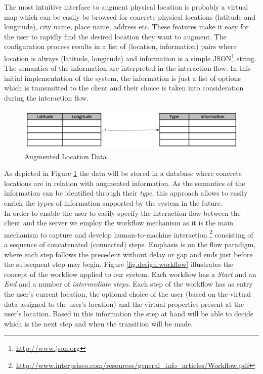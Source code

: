 \noindent The most intuitive interface to augment physical location is probably a virtual map which can be easily be browsed for concrete physical locations (latitude and longitude), city name, place name, address etc. These features make it easy for the user to rapidly find the desired location they want to augment. The configuration process results in a list of (location, information) pairs where location is always (latitude, longitude) and information is a simple JSON\footnote{\url{http://www.json.org}} string. The semantics of the information are interpreted in the interaction flow. In this initial implementation of the system, the information is just a list of options which is transmitted to the client and their choice is taken into consideration during the interaction flow.
\\

\begin{figure}[H]
	\centering
	\includegraphics[width=1.0\linewidth]{fig/virtual_properties}
	\caption{Augmented Location Data}
	\label{fig.design.virtual_properties}
\end{figure}
\noindent As depicted in Figure \ref{fig.design.virtual_properties} the data will be stored in a database where concrete locations are in relation with augmented information. As the semantics of the information can be identified through their \emph{type}, this approach allows to easily enrich the types of information supported by the system in the future.
\\

In order to enable the user to easily specify the interaction flow between the client and the server we employ the workflow mechanism as it is the main mechanism to  capture and develop human-to-machine interaction \footnote{\url{http://www.interpriseo.com/resources/general_info_articles/Workflow.pdf}} consisting of a sequence of concatenated (connected) steps. Emphasis is on the flow paradigm, where each step follows the precedent without delay or gap and ends just before the subsequent step may begin. Figure \ref{fig.design.workflow} illustrates the concept of the workflow applied to our system. Each workflow has a \emph{Start} and an \emph{End} and a number of \emph{intermediate steps}. Each step of the workflow has as entry the user's current location, the optional choice of the user (based on the virtual data assigned to the user's location) and the virtual properties present at the user's location. Based in this information the step at hand will be able to decide which is the next step and when the transition will be made. 
\\

